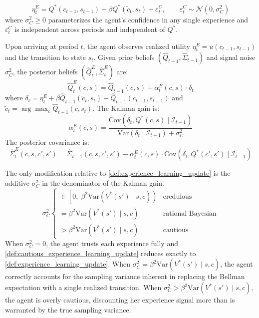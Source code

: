 \begin{equation}
    \eta^E_t = Q^*(c_{t-1}, s_{t-1}) - \beta Q^*(\tilde{c}_t, s_t) + \varepsilon^C_t, \qquad \varepsilon^C_t \sim \mathcal{N}(0, \sigma^2_C)
\end{equation}
where $\sigma^2_C \geq 0$ parameterizes the agent's confidence in any single experience 
and $\varepsilon^C_t$ is independent across periods and independent of $Q^*$.

\begin{definition} \label{def:cautious_experience_learning_update}
    Upon arriving at period $t$, the agent observes realized utility 
    $\eta^E_t = u(c_{t-1}, s_{t-1})$ and the transition to state $s_t$. Given prior 
    beliefs $(\hat{Q}_{t-1}, \hat{\Sigma}_{t-1})$ and signal noise $\sigma^2_C$, the 
    posterior beliefs $(\hat{Q}^E_t, \hat{\Sigma}^E_t)$ are:
    \begin{equation}
        \hat{Q}^E_t(c,s) = \hat{Q}_{t-1}(c,s) + \alpha^E_t(c,s) \cdot \delta_t
    \end{equation}
    where $\delta_t = \eta^E_t + \beta \hat{Q}_{t-1}(\tilde{c}_t, s_t) - \hat{Q}_{t-1}(c_{t-1}, s_{t-1})$ 
    and $\tilde{c}_t = \arg\max_{c} \hat{Q}_{t-1}(c, s_t)$. The Kalman gain is:
    \begin{equation}
        \alpha^E_t(c,s) = \frac{\mathrm{Cov}(\delta_t, Q^*(c,s) \mid \mathcal{I}_{t-1})}{\mathrm{Var}(\delta_t \mid \mathcal{I}_{t-1}) + \sigma^2_C}
    \end{equation}
    The posterior covariance is:
    \begin{equation}
        \hat{\Sigma}^E_t(c,s,c',s') = \hat{\Sigma}_{t-1}(c,s,c',s') - \alpha^E_t(c,s) \cdot \mathrm{Cov}(\delta_t, Q^*(c',s') \mid \mathcal{I}_{t-1})
    \end{equation}
\end{definition}

The only modification relative to \ref{def:experience_learning_update} is the 
additive $\sigma^2_C$ in the denominator of the Kalman gain.
\begin{equation}
    \sigma^2_C \begin{cases}
        \in \left[0, \; \beta^2 \mathrm{Var}(V^*(s') \mid s, c)\right) & \text{credulous} \\[4pt]
        = \beta^2 \mathrm{Var}(V^*(s') \mid s, c) & \text{rational Bayesian} \\[4pt]
        > \beta^2 \mathrm{Var}(V^*(s') \mid s, c) & \text{cautious}
    \end{cases}
\end{equation}
When $\sigma^2_C = 0$, the agent trusts each experience fully and 
\ref{def:cautious_experience_learning_update} reduces exactly to 
\ref{def:experience_learning_update}. When 
$\sigma^2_C = \beta^2 \mathrm{Var}(V^*(s') \mid s, c)$, the agent correctly accounts 
for the sampling variance inherent in replacing the Bellman expectation with a single 
realized transition. When $\sigma^2_C > \beta^2 \mathrm{Var}(V^*(s') \mid s, c)$, the agent is overly cautious,
discounting her experience signal more than is warranted by the true sampling variance.

